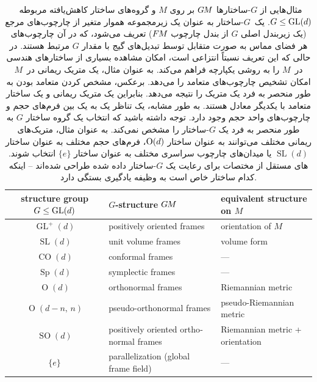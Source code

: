 \begin{table}
	\centering
	\renewcommand\arraystretch{1.1}
	\small
	\begin{latin}
		\begin{tabular}{cll}
			\toprule
			structure group $G\leq\operatorname{GL}(d)$ & $G$-structure $G\mkern-1.4muM$			& equivalent structure on $M$		\\[.25ex]
			\midrule
			$\operatorname{GL}^+(d)$	& positively oriented frames			& orientation of $M$			\\
			$\operatorname{SL}(d)$		& unit volume frames				& volume form				\\
			$\operatorname{CO}(d)$		& conformal frames				& ---					\\
			$\operatorname{Sp}(d)$		& symplectic frames				& ---					\\
			$\operatorname{O}(d)$		& orthonormal frames				& Riemannian metric			\\
			$\operatorname{O}(d-n,\,n)$	& pseudo-orthonormal frames			& pseudo-Riemannian metric		\\
			$\operatorname{SO}(d)$		& positively oriented orthonormal frames	& Riemannian metric + orientation	\\
			$\{e\}$				& parallelization (global frame field)	& ---					\\[.25ex]
			\bottomrule
		\end{tabular}
	\end{latin}
	\vspace*{2ex}
	\caption{
		مثال‌هایی از $G$-ساختارها $G\mkern-1.4muM$ بر روی $M$ و گروه‌های ساختار کاهش‌یافته مربوطه~$G\leq\operatorname{GL}(d)$.
		یک~$G$-ساختار به عنوان یک زیرمجموعه هموار متغیر از چارچوب‌های مرجع (یک زیربندل اصلی $G$ از بندل چارچوب $F\mkern-1.5muM$) تعریف می‌شود، که در آن چارچوب‌های هر فضای مماس به صورت متقابل توسط تبدیل‌های گیج با مقدار $G$ مرتبط هستند.
		در حالی که این تعریف نسبتاً انتزاعی است، امکان مشاهده بسیاری از ساختارهای هندسی در~$M$ را به روشی یکپارچه فراهم می‌کند.
		به عنوان مثال، یک متریک ریمانی در~$M$ امکان تشخیص چارچوب‌های متعامد را می‌دهد.
		برعکس، مشخص کردن متعامد بودن به طور منحصر به فرد یک متریک را نتیجه می‌دهد.
		بنابراین یک متریک ریمانی و یک ساختار متعامد با یکدیگر معادل هستند.
		به طور مشابه، یک تناظر یک به یک بین فرم‌های حجم و چارچوب‌های واحد حجم وجود دارد.
		توجه داشته باشید که انتخاب یک گروه ساختار $G$ به طور منحصر به فرد یک $G$-ساختار را مشخص نمی‌کند.
		به عنوان مثال، متریک‌های ریمانی مختلف می‌توانند به عنوان ساختار $\operatorname{O}(d)$، فرم‌های حجم مختلف به عنوان ساختار $\operatorname{SL}(d)$ یا میدان‌های چارچوب سراسری مختلف به عنوان ساختار $\{e\}$ انتخاب شوند.
		\CNN{}های مستقل از مختصات برای رعایت یک $G$-ساختار داده شده طراحی شده‌اند -- اینکه کدام ساختار خاص است به وظیفه یادگیری بستگی دارد.
	}
	\label{tab:G_structures}
\end{table}


